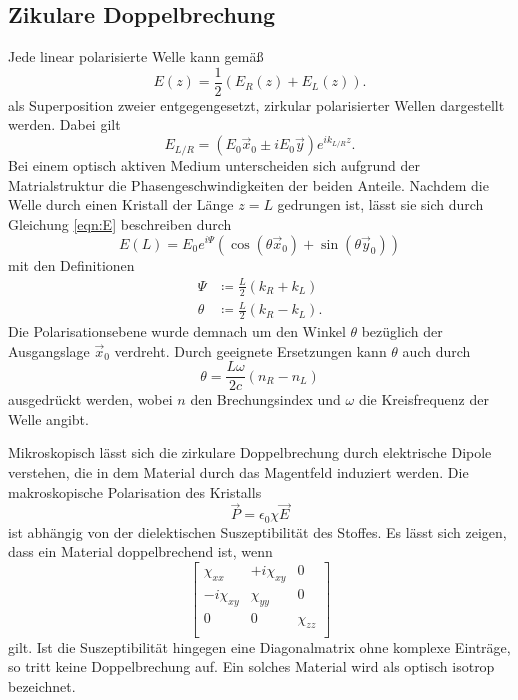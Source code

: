 \subsection{Zikulare Doppelbrechung}
Jede linear polarisierte Welle kann gemäß
\begin{equation}
    E(z)=\frac{1}{2}(E_R(z)+E_L(z)) . 
    \label{eqn:E}   
\end{equation}
als Superposition zweier entgegengesetzt, zirkular polarisierter Wellen dargestellt werden. Dabei gilt 
\begin{equation*}
    E_{L/R}=(E_0\vec{x}_0\pm iE_0\vec{y})e^{ik_{L/R}z} .
\end{equation*}
Bei einem optisch aktiven Medium unterscheiden sich aufgrund der Matrialstruktur die Phasengeschwindigkeiten der beiden Anteile. 
Nachdem die Welle durch einen Kristall der Länge $z=L$ gedrungen ist, lässt sie sich durch Gleichung \ref{eqn:E} beschreiben durch
\begin{equation*}
    E(L)=E_0e^{i\Psi}(\cos{(\theta\vec{x}_0)}+\sin{(\theta\vec{y}_0)})
\end{equation*}
mit den Definitionen
\begin{align*}
    \Psi  &\coloneqq \frac{L}{2}(k_R+k_L)\\
    \theta&\coloneqq \frac{L}{2}(k_R-k_L) .
\end{align*}
Die Polarisationsebene wurde demnach um den Winkel $\theta$ bezüglich der Ausgangslage $\vec{x}_0$ verdreht. Durch geeignete 
Ersetzungen kann $\theta$ auch durch 
\begin{equation*}
    \theta=\frac{L\omega}{2c}(n_R-n_L)
\end{equation*}
ausgedrückt werden, wobei $n$ den Brechungsindex und $\omega$ die Kreisfrequenz der Welle angibt.

Mikroskopisch lässt sich die zirkulare Doppelbrechung durch elektrische Dipole verstehen, die in dem Material durch das 
Magentfeld induziert werden. Die makroskopische Polarisation des Kristalls 
\begin{equation*}
    \vec{P}=\epsilon_0\chi\vec{E}
\end{equation*}
ist abhängig von der dielektischen Suszeptibilität des Stoffes. Es lässt sich zeigen, dass ein Material doppelbrechend ist, wenn
\begin{equation}
    \left[
        \begin{array}{ccc}
        \chi_{xx}          & +i\chi_{xy} & 0         \\ 
        -i\chi_{xy}   & \chi_{yy}        & 0         \\
        0                  & 0                & \chi_{zz} \\ 
    \end{array}
    \right]
    \label{eqn:chi}
\end{equation}
gilt. Ist die Suszeptibilität hingegen eine Diagonalmatrix ohne komplexe Einträge, so tritt keine Doppelbrechung auf. Ein solches 
Material wird als optisch isotrop bezeichnet. 

